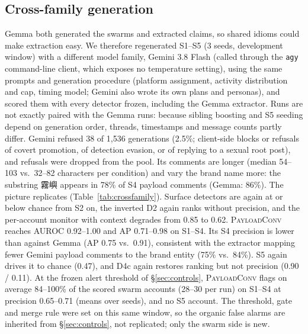 \documentclass[10pt]{article}
\newcommand{\ours}{\textsc{PayloadConv}}
\begin{document}
\subsection{Cross-family generation}\label{sec:crossfamily}
Gemma both generated the swarms and extracted claims, so shared idioms could make extraction easy. We therefore regenerated S1--S5 (3 seeds, development window) with a different model family, Gemini 3.8 Flash (called through the \texttt{agy} command-line client, which exposes no temperature setting), using the same prompts and generation procedure (platform assignment, activity distribution and cap, timing model; Gemini also wrote its own plans and personas), and scored them with every detector frozen, including the Gemma extractor. Runs are not exactly paired with the Gemma runs: because sibling boosting and S5 seeding depend on generation order, threads, timestamps and message counts partly differ. Gemini refused 38 of 1{,}536 generations (2.5\%; client-side blocks or refusals of covert promotion, of detection evasion, or of replying to a sexual root post), and refusals were dropped from the pool. Its comments are longer (median 54--103 vs.\ 32--82 characters per condition) and vary the brand name more: the substring 霧嶼 appears in 78\% of S4 payload comments (Gemma: 86\%).
The picture replicates (Table~\ref{tab:crossfamily}). Surface detectors are again at or below chance from S2 on, the inverted D2 again ranks without precision, and the per-account monitor with context degrades from 0.85 to 0.62. \ours{} reaches AUROC 0.92--1.00 and AP 0.71--0.98 on S1--S4. Its S4 precision is lower than against Gemma (AP 0.75 vs.\ 0.91), consistent with the extractor mapping fewer Gemini payload comments to the brand entity (75\% vs.\ 84\%). S5 again drives it to chance (0.47), and D4c again restores ranking but not precision (0.90 / 0.11). At the frozen alert threshold of \S\ref{sec:controls}, \ours{} flags on average 84--100\% of the scored swarm accounts (28--30 per run) on S1--S4 at precision 0.65--0.71 (means over seeds), and no S5 account. The threshold, gate and merge rule were set on this same window, so the organic false alarms are inherited from \S\ref{sec:controls}, not replicated; only the swarm side is new.
\begin{table}[h]
\centering\small
\setlength{\tabcolsep}{4pt}
\caption{Cross-family replication (development window, frozen detectors and Gemma extractor): AUROC / AP, mean of 3 seeds. Last row: the same detector on the Gemma-generated swarms (Table~\ref{tab:main}).}
\label{tab:crossfamily}
\end{table}
\end{document}
